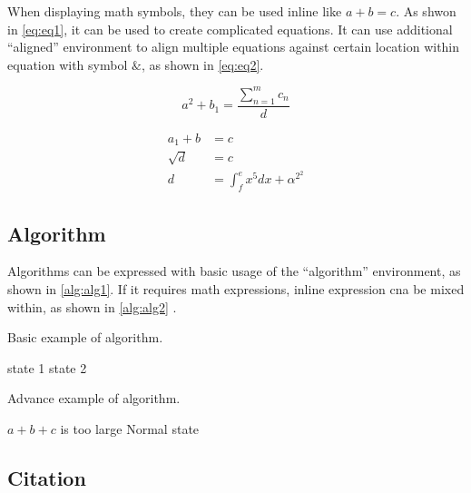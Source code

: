When displaying math symbols, they can be used inline like $a+b=c$. As shwon in \autoref{eq:eq1}, it can be used to create complicated equations. It can use additional \enquote{aligned} environment to align multiple equations against certain location within equation with symbol $\&$, as shown in \autoref{eq:eq2}.

\begin{equation}
    a^2+b_1=\dfrac{\sum\limits^{m}_{n=1}c_n}{d}
    \label{eq:eq1}
\end{equation}

\begin{equation}
    \begin{aligned}
        a_1+b&=c \\
        \sqrt{d}&=c \\
        d&=\int^e_fx^5dx+\alpha^{2^2}
    \label{eq:eq2}
    \end{aligned}
\end{equation}

\subsection{Algorithm}

Algorithms can be expressed with basic usage of the \enquote{algorithm} environment, as shown in \autoref{alg:alg1}. If it requires math expressions, inline expression cna be mixed within, as shown in \autoref{alg:alg2} \cite{overleaf_alg}.

\begin{algorithm}
    \caption{Basic example of algorithm.}
    \label{alg:alg1}
    \begin{algorithmic}
            \State state 1
        \Else
            \State state 2
        \EndIf
    \end{algorithmic}
\end{algorithm}

\begin{algorithm}
    \caption{Advance example of algorithm.}
    \label{alg:alg2}
    \begin{algorithmic}
            \State $a+b+c$ is too large
        \Else
            \State Normal state
        \EndIf
    \end{algorithmic}
\end{algorithm}

\subsection{Citation}
